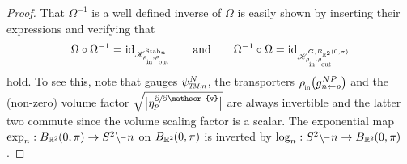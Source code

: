 \begin{proof}
    That $\Omega^{-1}$ is a well defined inverse of $\Omega$ is easily shown by inserting their expressions and verifying that
    \begin{align}
        \Omega \circ \Omega^{-1} = \id_{\mathscr{K}^{\Stab{n}}_{\rhoin\mkern-1mu,\rhoout}}
        \qquad \textup{and} \qquad
        \Omega^{-1} \circ \Omega = \id_{\mathscr{K}^{G,B_{\R^2}\mkern-1mu(0,\pi)}_{\rhoin\mkern-1mu,\rhoout}}
    \end{align}
    hold.
    To see this, note that gauges $\psiTMn^N$, the transporters $\rhoin\big( g_{n\leftarrow p}^{NP} \big)$ and the (non-zero) volume factor $\sqrt{\big|\eta_p^{\partial\mkern-2mu/\mkern-2mu\partial\mathscr{v}}\big|}$ are always invertible and the latter two commute since the volume scaling factor is a scalar.
    The exponential map $\exp_n: B_{\R^2}\mkern-1mu(0,\pi) \to S^2 \backslash \mkern-1mu\minus\mkern1mu n$ on $B_{\mathbb{R}^2}\mkern-1mu(0,\pi)$ is inverted by $\log_n: S^2 \backslash \mkern-1mu\minus\mkern1mu n \to B_{\R^2}\mkern-1mu(0,\pi)$.



\end{proof}
